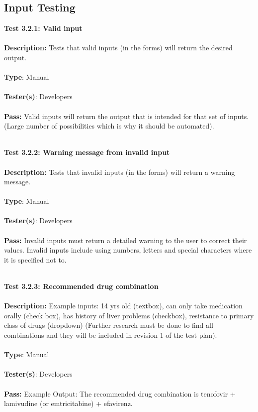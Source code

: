 \documentclass[12pt]{article}
\begin{document}
\subsection{Input Testing}

\begin{tcolorbox}
\textbf{Test 3.2.1: Valid input} \\ \\
\textbf{Description:} Tests that valid inputs (in the forms) will return the desired output. \\ \\
\textbf{Type}: Manual \\ \\
\textbf{Tester(s)}: Developers \\ \\
\textbf{Pass:} Valid inputs will return the output that is intended for that set of inputs. (Large number of possibilities which is why it should be automated). \\ \\
\end{tcolorbox}

\begin{tcolorbox}
\textbf{Test 3.2.2: Warning message from invalid input} \\ \\
\textbf{Description:} Tests that invalid inputs (in the forms) will return a warning message. \\ \\
\textbf{Type}: Manual \\ \\
\textbf{Tester(s)}: Developers \\ \\
\textbf{Pass:} Invalid inputs must return a detailed warning to the user to correct their values. Invalid inputs include using numbers, letters and special characters where it is specified not to. \\ \\
\end{tcolorbox}

\begin{tcolorbox}
\textbf{Test 3.2.3: Recommended drug combination } \\ \\
\textbf{Description:} Example inputs: 14 yrs old (textbox), can only take medication orally (check box), has history of liver problems (checkbox), resistance to primary class of drugs (dropdown) (Further research must be done to find all combinations and they will be included in revision 1 of the test plan). \\ \\
\textbf{Type}: Manual \\ \\
\textbf{Tester(s)}: Developers \\ \\
\textbf{Pass:} Example Output: The recommended drug combination is tenofovir + lamivudine (or emtricitabine) + efavirenz. \\ \\
\end{tcolorbox}
\end{document}
